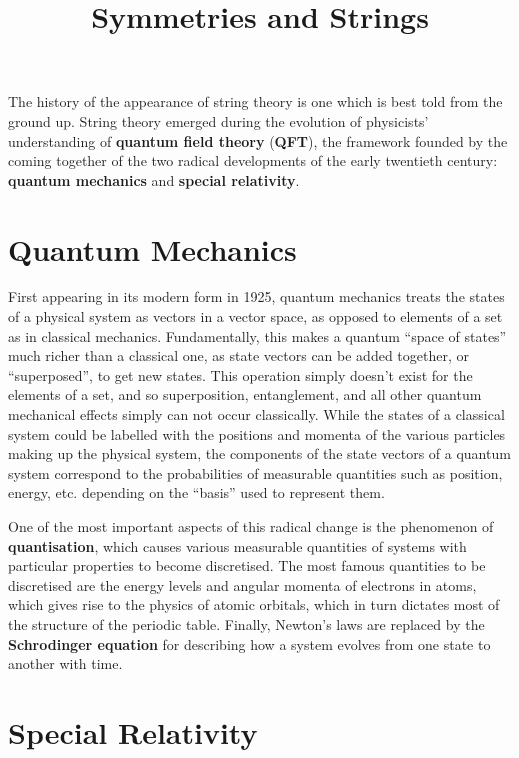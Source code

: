 \documentclass[12pt]{article}
\title{Symmetries and Strings}
\author{}
\date{}
\begin{document}
\maketitle
\vspace{-0.8em}

The history of the appearance of string theory is one which is best told from the ground up. String theory emerged during the evolution of physicists' understanding of \textbf{quantum field theory} (\textbf{QFT}), the framework founded by the coming together of the two radical developments of the early twentieth century: \textbf{quantum mechanics} and \textbf{special relativity}.

\section{Quantum Mechanics}

First appearing in its modern form in 1925, quantum mechanics treats the states of a physical system as vectors in a vector space, as opposed to elements of a set as in classical mechanics. Fundamentally, this makes a quantum ``space of states'' much richer than a classical one, as state vectors can be added together, or ``superposed'', to get new states. This operation simply doesn't exist for the elements of a set, and so superposition, entanglement, and all other quantum mechanical effects simply can not occur classically. While the states of a classical system could be labelled with the positions and momenta of the various particles making up the physical system, the components of the state vectors of a quantum system correspond to the probabilities of measurable quantities such as position, energy, etc. depending on the ``basis'' used to represent them.
\newline

One of the most important aspects of this radical change is the phenomenon of \textbf{quantisation}, which causes various measurable quantities of systems with particular properties to become discretised. The most famous quantities to be discretised are the energy levels and angular momenta of electrons in atoms, which gives rise to the physics of atomic orbitals, which in turn dictates most of the structure of the periodic table. Finally, Newton's laws are replaced by the \textbf{Schrodinger equation} for describing how a system evolves from one state to another with time.

\section{Special Relativity}
\end{document}
